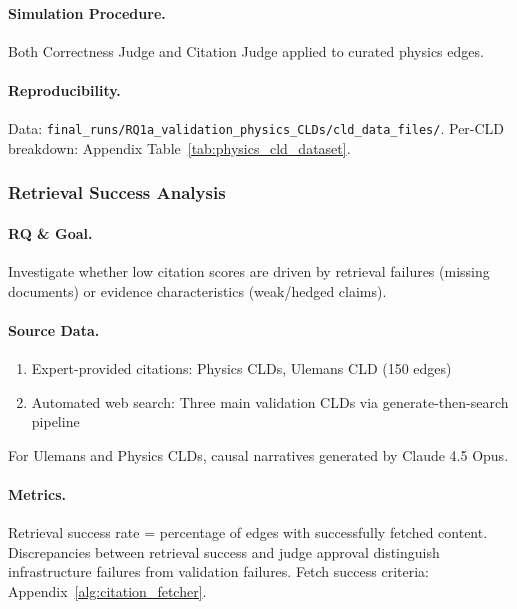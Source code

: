 \paragraph{Simulation Procedure.}
Both Correctness Judge and Citation Judge applied to curated physics edges.

\paragraph{Reproducibility.}
Data: \texttt{final\_runs/RQ1a\_validation\_physics\_CLDs/cld\_data\_files/}. Per-CLD breakdown: Appendix Table~\ref{tab:physics_cld_dataset}.

\subsubsection{Retrieval Success Analysis}
\label{sec:retrieval_success}

\paragraph{RQ \& Goal.}
Investigate whether low citation scores are driven by retrieval failures (missing documents) or evidence characteristics (weak/hedged claims).

\paragraph{Source Data.}
\begin{enumerate}[noitemsep]
    \item Expert-provided citations: Physics CLDs, Ulemans CLD (150 edges)
    \item Automated web search: Three main validation CLDs via generate-then-search pipeline
\end{enumerate}
For Ulemans and Physics CLDs, causal narratives generated by Claude 4.5 Opus.

\paragraph{Metrics.}
Retrieval success rate = percentage of edges with successfully fetched content. Discrepancies between retrieval success and judge approval distinguish infrastructure failures from validation failures. Fetch success criteria: Appendix~\ref{alg:citation_fetcher}.

